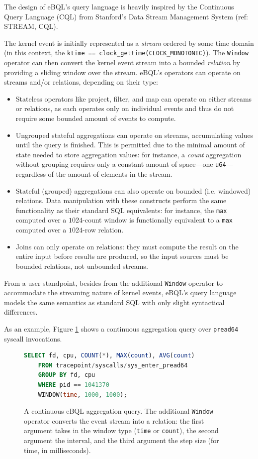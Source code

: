 The design of eBQL's query language is heavily inspired by the Continuous Query Language (CQL) from
Stanford's Data Stream Management System (ref: STREAM, CQL).

The kernel event is initially represented as a \textit{stream} ordered by some time domain (in this
context, the \texttt{ktime == clock\_gettime(CLOCK\_MONOTONIC)}). The \texttt{Window} operator can
then convert the kernel event stream into a bounded \textit{relation} by providing a sliding window
over the stream. eBQL's operators can operate on streams and/or relations, depending on their type:
\begin{itemize}
    \item Stateless operators like project, filter, and map can operate on either streams or
        relations, as each operates only on individual events and thus do not require some bounded
        amount of events to compute.
    \item Ungrouped stateful aggregations can operate on streams, accumulating values until the
        query is finished. This is permitted due to the minimal amount of state needed to store
        aggregation values: for instance, a \textit{count} aggregation without grouping requires
        only a constant amount of space---one \texttt{u64}---regardless of the amount of elements in
        the stream.
    \item Stateful (grouped) aggregations can also operate on bounded (i.e. windowed) relations.
        Data manipulation with these constructs perform the same functionality as their standard SQL
        equivalents: for instance, the \texttt{max} computed over a $1024$-count window is
        functionally equivalent to a \texttt{max} computed over a $1024$-row relation.
    \item Joins can only operate on relations: they must compute the result on the entire input
        before results are produced, so the input sources must be bounded relations, not unbounded
        streams.
\end{itemize}

From a user standpoint, besides from the additional \texttt{Window} operator to accommodate the
streaming nature of kernel events, eBQL's query language models the same semantics as standard SQL
with only slight syntactical differences.

As an example, Figure \ref{code:ebql-ex} shows a continuous aggregation query over \texttt{pread64}
syscall invocations.
\begin{figure}[htpb]
\begin{lstlisting}[language=SQL]
SELECT fd, cpu, COUNT(*), MAX(count), AVG(count)
    FROM tracepoint/syscalls/sys_enter_pread64
    GROUP BY fd, cpu
    WHERE pid == 1041370
    WINDOW(time, 1000, 1000);
\end{lstlisting}
\caption{A continuous eBQL aggregation query. The additional \texttt{Window} operator converts the
event stream into a relation: the first argument takes in the window type (\texttt{time} or
\texttt{count}), the second argument the interval, and the third argument the step size (for time,
in milliseconds).}
\label{code:ebql-ex}
\end{figure}

